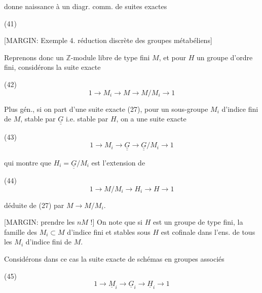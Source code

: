 donne naissance à un diagr. comm.
de suites exactes

\newpage


(41)

[MARGIN: Exemple 4. réduction discrète des groupes métabéliens]

Reprenons donc un $\mathbb{Z}$-module libre
de type fini $M$, et pour $H$ un
groupe d'ordre fini, considérons
la suite exacte

(42) $$1 \longrightarrow M_i \longrightarrow M \longrightarrow M/M_i \longrightarrow 1$$

Plus gén., si on part d'une suite
exacte (27), pour un sous-groupe $M_i$
d'indice fini de $M$, stable par
$\underline{\underline{G}}$ i.e. stable par $H$, on a une
suite exacte

(43) $$1 \longrightarrow M_i \longrightarrow \underline{\underline{G}} \longrightarrow \underline{\underline{G}}/M_i \longrightarrow 1$$

qui montre que $H_i = \underline{\underline{G}}/M_i$
est l'extension de

(44) $$1 \longrightarrow M/M_i \longrightarrow H_i \longrightarrow H \longrightarrow 1$$

déduite de (27) par
$M \longrightarrow M/M_i$.

\newpage


[MARGIN: prendre les $n M$ !]
On note que si $H$ est un groupe
de type fini, la famille
des $M_i \subset M$ d'indice fini et
stables sous $H$ est cofinale dans l'ens.
de tous les $M_i$ d'indice fini de $M$.

Considérons dans ce cas la suite exacte de
schémas en groupes associés

(45) $$1 \to \underline{M}_i \to \underline{G}_i \to \underline{H}_i \to 1$$

